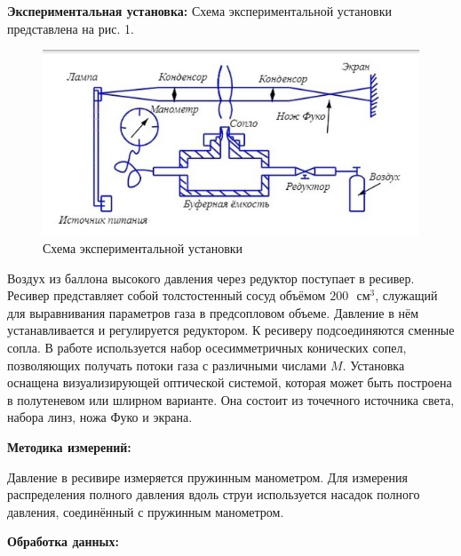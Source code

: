 \documentclass[a4paper,12pt]{article}
\begin{document}
\textbf{Экспериментальная установка:}
Схема экспериментальной установки представлена на рис. 1. 
\begin{figure}[H]\label{fig: ustanovka scheme}
    \centering
    \includegraphics[width = 0.9 \textwidth]{Схема установки.png}
    \caption{Схема экспериментальной установки}
\end{figure}
Воздух из баллона высокого давления через редуктор поступает в ресивер. Ресивер представляет собой толстостенный сосуд объёмом $200 \text { } см^3$, служащий для выравнивания параметров газа в предсопловом объеме. Давление в нём устанавливается и регулируется редуктором. К ресиверу подсоединяются сменные сопла. В работе используется набор осесимметричных конических сопел, позволяющих получать потоки газа с различными числами $M$. Установка оснащена визуализирующей оптической системой, которая может быть построена в полутеневом или шлирном варианте. Она состоит из точечного источника света, набора линз, ножа Фуко и экрана.

\textbf{Методика измерений:}

Давление в ресивире измеряется пружинным манометром. Для измерения распределения полного давления вдоль струи используется насадок полного  давления, соединённый с пружинным манометром.  

\textbf{Обработка данных:} 
\end{document}
